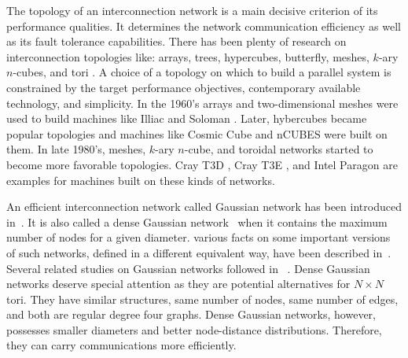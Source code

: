 \documentclass[12pt,journal,compsoc,onecolumn,]{IEEEtran}
\begin{document}
The topology of an interconnection network is a main decisive criterion of its
performance qualities. It determines the network communication efficiency as
well as its fault tolerance capabilities. There has been plenty of research on
interconnection topologies like: arrays, trees, hypercubes, butterfly, meshes,
$k$-ary $n$-cubes, and tori \cite{bose1995lee} \cite{dally2004principles}
\cite{leighton2014introduction}. A choice of a topology on which to build a
parallel system is constrained by the target performance objectives,
contemporary available technology, and simplicity. In the 1960's arrays and
two-dimensional meshes were used to build machines like Illiac
\cite{barnes1968illiac} and Soloman \cite{Slotnick:1962:SC:1461518.1461528}.
Later, hybercubes became popular topologies and machines like Cosmic Cube
\cite{seitz1985cosmic} and nCUBES \cite{Ncube:1988:NFH:62297.62415} were built
on them. In late 1980's, meshes, $k$-ary $n$-cube, and toroidal networks
started to become more favorable topologies. Cray T3D \cite{cray1993}, Cray
T3E \cite{scott1996cray}, and Intel Paragon \cite{esser1993intel} are examples
for machines built on these kinds of networks.

An efficient interconnection network called Gaussian network has been
introduced in~\cite{10.1109/TC.2008.57}. It is also called a dense Gaussian network~\cite{martinez2006dense}
when it contains the maximum number of nodes for a given diameter. various facts on some important
versions of such networks, defined in a different equivalent way, have been
described in~\cite{martinez2006dense}. Several related studies on Gaussian
networks followed in~\cite{Flahive:2010:TGE:1850268.1850301}
\cite{Shamaei:2014:HDG:2672598.2673055} \cite{touzene2015all}
\cite{zhang2013efficient}.
Dense Gaussian networks deserve special attention as they are potential alternatives
for $N \times N$ tori.
They have similar structures, same number of nodes, same
number of edges, and both are regular degree four graphs.
Dense Gaussian networks, however,
possesses smaller diameters and better node-distance distributions.
Therefore, they can carry communications more efficiently.
\end{document}

